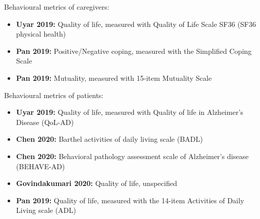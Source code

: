 \documentclass[
]{article}
\providecommand{\tightlist}{%
  \setlength{\itemsep}{0pt}\setlength{\parskip}{0pt}}
\begin{document}
Behavioural metrics of caregivers:

\begin{itemize}
\tightlist
\item
  \textbf{Uyar 2019:} Quality of life, measured with Quality of Life
  Scale SF36 (SF36 physical health)
\item
  \textbf{Pan 2019:} Positive/Negative coping, measured with the
  Simplified Coping Scale
\item
  \textbf{Pan 2019:} Mutuality, measured with 15-item Mutuality Scale
\end{itemize}

Behavioural metrics of patients:

\begin{itemize}
\tightlist
\item
  \textbf{Uyar 2019:} Quality of life, measured with Quality of life in
  Alzheimer's Disease (QoL-AD)
\item
  \textbf{Chen 2020:} Barthel activities of daily living scale (BADL)
\item
  \textbf{Chen 2020:} Behavioral pathology assessment scale of
  Alzheimer's disease (BEHAVE-AD)
\item
  \textbf{Govindakumari 2020:} Quality of life, unspecified
\item
  \textbf{Pan 2019:} Quality of life, measured with the 14-item
  Activities of Daily Living scale (ADL)
\end{itemize}
\end{document}
